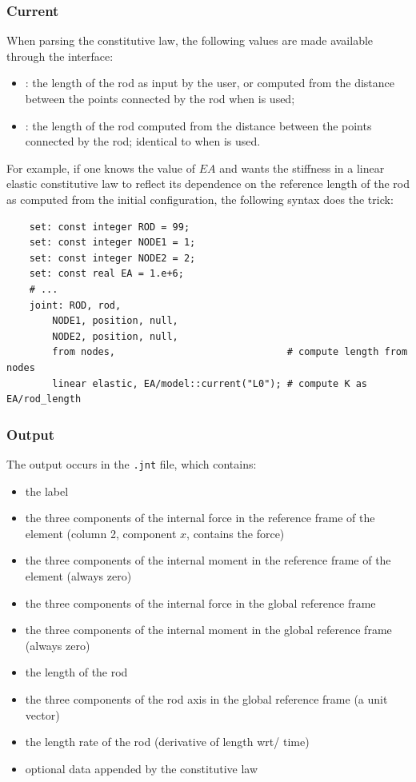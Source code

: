 \subsubsection{Current}
When parsing the constitutive law, the following values are made available
through the  interface:
\begin{itemize}
\item
{}:
the length of the rod  as input by the user,
or computed from the distance between the points connected by the rod when  is used;

\item
{}: 
the length of the rod computed from the distance between the points connected by the rod;
identical to  when  is used.
\end{itemize}
For example, if one knows the value of $EA$ and wants the stiffness
in a linear elastic constitutive law to reflect its dependence
on the reference length of the rod as computed from the initial configuration,
the following syntax does the trick:
\begin{verbatim}
    set: const integer ROD = 99;
    set: const integer NODE1 = 1;
    set: const integer NODE2 = 2;
    set: const real EA = 1.e+6;
    # ...
    joint: ROD, rod,
        NODE1, position, null,
        NODE2, position, null,
        from nodes,                              # compute length from nodes
        linear elastic, EA/model::current("L0"); # compute K as EA/rod_length
\end{verbatim}



\subsubsection{Output}
The output occurs in the \texttt{.jnt} file, which contains:
\begin{itemize}
\item the label
\item the three components of the internal force in the reference frame
of the element (column 2, component $x$, contains the force)
\item the three components of the internal moment in the reference frame
of the element (always zero)
\item the three components of the internal force in the global
reference frame
\item the three components of the internal moment in the global
reference frame (always zero)
\item the length of the rod
\item the three components of the rod axis in the global reference frame
(a unit vector)
\item the length rate of the rod (derivative of length wrt/ time)
\item optional data appended by the constitutive law
\end{itemize}

